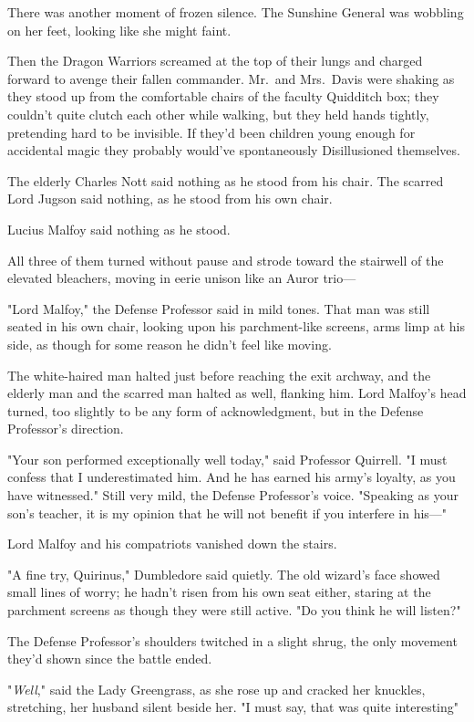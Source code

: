 There was another moment of frozen silence. The Sunshine General was wobbling
on her feet, looking like she might faint.

Then the Dragon Warriors screamed at the top of their lungs and charged forward
to avenge their fallen commander.
\sbreak
Mr.~and Mrs.~Davis were shaking as they stood up from the comfortable chairs of
the faculty Quidditch box; they couldn't quite clutch each other while walking,
but they held hands tightly, pretending hard to be invisible. If they'd been
children young enough for accidental magic they probably would've spontaneously
Disillusioned themselves.

The elderly Charles Nott said nothing as he stood from his chair. The scarred
Lord Jugson said nothing, as he stood from his own chair.

Lucius Malfoy said nothing as he stood.

All three of them turned without pause and strode toward the stairwell of the
elevated bleachers, moving in eerie unison like an Auror trio—

"Lord Malfoy," the Defense Professor said in mild tones. That man was still
seated in his own chair, looking upon his parchment-like screens, arms limp at
his side, as though for some reason he didn't feel like moving.

The white-haired man halted just before reaching the exit archway, and the
elderly man and the scarred man halted as well, flanking him. Lord Malfoy's
head turned, too slightly to be any form of acknowledgment, but in the Defense
Professor's direction.

"Your son performed exceptionally well today," said Professor Quirrell. "I must
confess that I underestimated him. And he has earned his army's loyalty, as you
have witnessed." Still very mild, the Defense Professor's voice. "Speaking as
your son's teacher, it is my opinion that he will not benefit if you interfere
in his—"

Lord Malfoy and his compatriots vanished down the stairs.

"A fine try, Quirinus," Dumbledore said quietly. The old wizard's face showed
small lines of worry; he hadn't risen from his own seat either, staring at the
parchment screens as though they were still active. "Do you think he will
listen?"

The Defense Professor's shoulders twitched in a slight shrug, the only movement
they'd shown since the battle ended.

"\emph{Well}," said the Lady Greengrass, as she rose up and cracked her
knuckles, stretching, her husband silent beside her. "I must say, that was
quite{\el} interesting{\el}"


